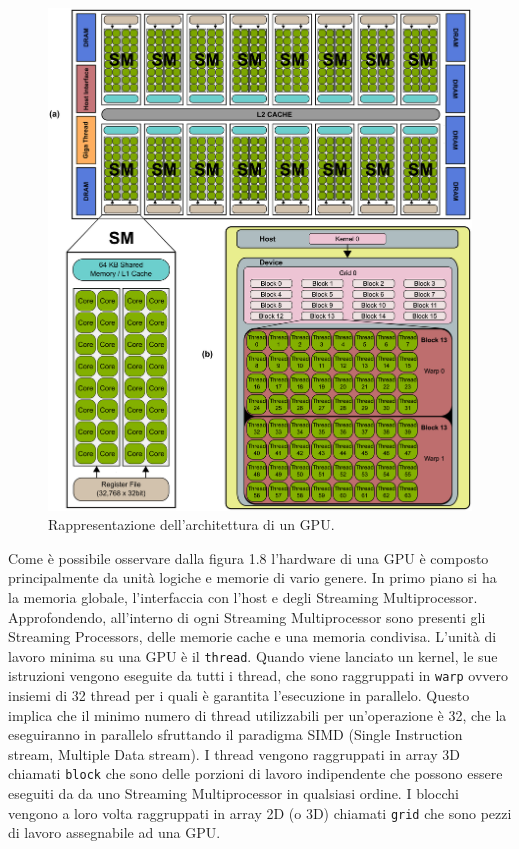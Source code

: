 \documentclass[12pt,a4paper]{report}
\begin{document}
\begin{figure}[H]
    \centering
    \includegraphics[scale=0.7]{img/arc-gpu.png}
    \caption{Rappresentazione dell'architettura di un GPU. 
}
\end{figure} \newpage

Come è possibile osservare dalla figura 1.8 l'hardware di una GPU è composto principalmente da unità logiche e memorie di vario genere.
In primo piano si ha la memoria globale, l'interfaccia con l'host e degli Streaming Multiprocessor. Approfondendo, all'interno di ogni Streaming Multiprocessor sono presenti gli Streaming Processors, delle memorie cache e una memoria condivisa. \newline 
L'unità di lavoro minima su una GPU è il \verb|thread|. Quando viene lanciato un kernel, le sue istruzioni vengono eseguite da tutti i thread, che sono raggruppati in \verb|warp| ovvero insiemi di 32 thread per i quali è garantita l'esecuzione in parallelo. Questo implica che il minimo numero di thread utilizzabili per un'operazione è 32, che la eseguiranno in parallelo sfruttando il paradigma SIMD (Single Instruction stream, Multiple Data stream).\newline
I thread vengono raggruppati in array 3D chiamati \verb|block| che sono delle porzioni di lavoro indipendente che possono essere eseguiti da da uno Streaming Multiprocessor in qualsiasi ordine. \newline
I blocchi vengono a loro volta raggruppati in array 2D (o 3D) chiamati \verb|grid| che sono pezzi di lavoro assegnabile ad una GPU.
\end{document}
